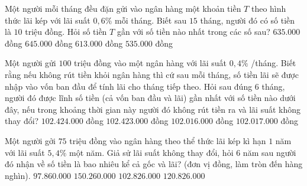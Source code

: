 \begin{ex}%
	Một người mỗi tháng đều đặn gửi vào ngân hàng một khoản tiền $T$ theo hình thức lãi kép với lãi suất $0{,}6\%$ mỗi tháng. Biết sau $15$ tháng, người đó có số tiền là $10$ triệu đồng. Hỏi số tiền $T$ gần với số tiền nào nhất trong các số sau?
	\choice
	{\True $635.000$ đồng}
	{$645.000$ đồng}
	{$613.000$ đồng}
	{$535.000$ đồng}
\end{ex}
\begin{ex}%
	Một người gửi $100$ triệu đồng vào một ngân hàng với lãi suất $0{,}4\%$ /tháng. Biết rằng nếu không rút tiền khỏi ngân hàng thì cứ sau mỗi tháng, số tiền lãi sẽ được nhập vào vốn ban đầu để tính lãi cho tháng tiếp theo. Hỏi sau đúng $6$ tháng, người đó được lĩnh số tiền (cả vốn ban đầu và lãi) gần nhất với số tiền nào dưới đây, nếu trong khoảng thời gian này người đó không rút tiền ra và lãi suất không thay đổi?
	\choice
	{\True $102.424.000$ đồng}
	{$102.423.000$ đồng}
	{$102.016.000$ đồng}
	{$102.017.000$ đồng}
\end{ex}
\begin{ex}%
	Một người gởi $75$ triệu đồng vào ngân hàng theo thể thức lãi kép kì hạn $1$ năm với lãi suất $5{,}4\%$ một năm. Giả sử lãi suất không thay đổi, hỏi $6$ năm sau người đó nhận về số tiền là bao nhiêu kể cả gốc và lãi? (đơn vị đồng, làm tròn đến hàng nghìn).
	\choice
	{$97.860.000$}
	{$150.260.000$}
	{\True $102.826.000$}
	{$120.826.000$}
\end{ex}
